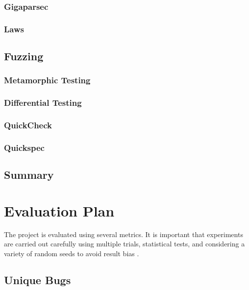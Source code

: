 \documentclass{article}
\begin{document}
\subsubsection{Gigaparsec}
\subsubsection{Laws}

\subsection{Fuzzing}
\subsubsection{Metamorphic Testing}
\subsubsection{Differential Testing}
\subsubsection{QuickCheck}
\subsubsection{Quickspec}

\subsection{Summary}

\section{Evaluation Plan} %

The project is evaluated using several metrics. It is important that experiments are carried out carefully using multiple trials, statistical tests, and considering a variety of random seeds to avoid result bias \cite{evaluation}.

\subsection{Unique Bugs}
\end{document}
